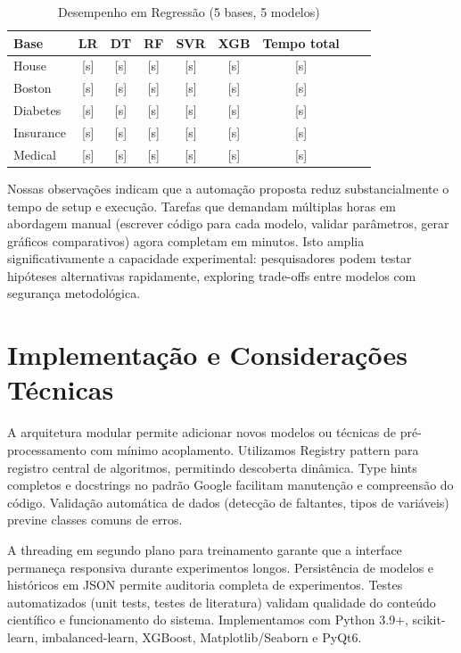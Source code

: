 \documentclass[12pt]{article}
\begin{document}
\begin{table}[H]
\caption{Desempenho em Regressão (5 bases, 5 modelos)}
\label{tab:regression}
\centering
\small
\begin{tabular}{|l|c|c|c|c|c|c|c|c|}
\hline
\textbf{Base} & \textbf{LR} & \textbf{DT} & \textbf{RF} & \textbf{SVR} & \textbf{XGB} & \textbf{Tempo total} \\
\hline
House & [s] & [s] & [s] & [s] & [s] & [s] \\
\hline
Boston & [s] & [s] & [s] & [s] & [s] & [s] \\
\hline
Diabetes & [s] & [s] & [s] & [s] & [s] & [s] \\
\hline
Insurance & [s] & [s] & [s] & [s] & [s] & [s] \\
\hline
Medical & [s] & [s] & [s] & [s] & [s] & [s] \\
\hline
\end{tabular}
\end{table}

Nossas observações indicam que a automação proposta reduz substancialmente o tempo de setup e execução. Tarefas que demandam múltiplas horas em abordagem manual (escrever código para cada modelo, validar parâmetros, gerar gráficos comparativos) agora completam em minutos. Isto amplia significativamente a capacidade experimental: pesquisadores podem testar hipóteses alternativas rapidamente, exploring trade-offs entre modelos com segurança metodológica.

\section{Implementação e Considerações Técnicas}

A arquitetura modular permite adicionar novos modelos ou técnicas de pré-processamento com mínimo acoplamento. Utilizamos Registry pattern para registro central de algoritmos, permitindo descoberta dinâmica. Type hints completos e docstrings no padrão Google facilitam manutenção e compreensão do código. Validação automática de dados (detecção de faltantes, tipos de variáveis) previne classes comuns de erros.

A threading em segundo plano para treinamento garante que a interface permaneça responsiva durante experimentos longos. Persistência de modelos e históricos em JSON permite auditoria completa de experimentos. Testes automatizados (unit tests, testes de literatura) validam qualidade do conteúdo científico e funcionamento do sistema. Implementamos com Python 3.9+, scikit-learn, imbalanced-learn, XGBoost, Matplotlib/Seaborn e PyQt6.
\end{document}
